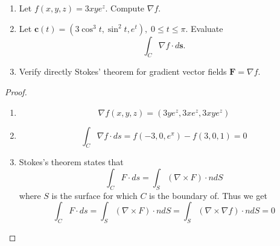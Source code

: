 \documentclass[openany]{book}
\begin{document}
\begin{prob}[13]
    \begin{enumerate}
        \item[(a)] Let \( f(x, y, z) = 3xy e^z \). Compute \( \nabla f \).  
        \item[(b)] Let \( \mathbf{c}(t) = (3 \cos^3 t, \sin^2 t, e^t), \; 0 \leq t \leq \pi \). Evaluate
        \[
        \int_C \nabla f \cdot d\mathbf{s}.
        \]
        \item[(c)] Verify directly Stokes' theorem for gradient vector fields \( \mathbf{F} = \nabla f \).
    \end{enumerate}
\end{prob}
\begin{proof}
    \begin{enumerate}
        \item[(a)] \begin{equation*}
            \nabla f(x,y,z)=\left(3ye^z, 3xe^z, 3xye^z\right)
        \end{equation*} 
        \item[(b)] \begin{equation*}
            \int_C\nabla f\cdot ds=f(-3, 0, e^\pi)-f(3, 0, 1)=0
        \end{equation*}
        \item[(c)] Stokes's theorem states that 
        \begin{equation*}
            \int_CF\cdot ds=\int_S\left(\nabla\times F\right)\cdot ndS
        \end{equation*}
        where $S$ is the surface for which $C$ is the boundary of. Thus we get 
        \begin{equation*}
            \int_CF\cdot ds=\int_S\left(\nabla\times F\right)\cdot ndS=\int_S\left(\nabla\times\nabla f\right)\cdot ndS=0
        \end{equation*}
    \end{enumerate}
\end{proof}
\end{document}
